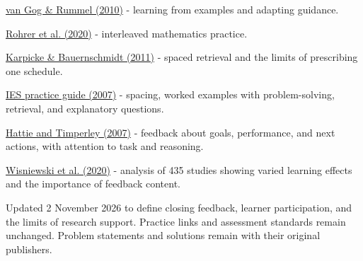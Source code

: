 \documentclass[11pt,letterpaper]{article}
\begin{document}
\href{https://link.springer.com/article/10.1007/s10648-010-9134-7}{van Gog \& Rummel (2010)} - learning from examples and adapting guidance.

\href{https://doi.org/10.1037/EDU0000367}{Rohrer et al. (2020)} - interleaved mathematics practice.

\href{https://pubmed.ncbi.nlm.nih.gov/21574747/}{Karpicke \& Bauernschmidt (2011)} - spaced retrieval and the limits of prescribing one schedule.

\href{https://ies.ed.gov/ncee/wwc/PracticeGuide/1}{IES practice guide (2007)} - spacing, worked examples with problem-solving, retrieval, and explanatory questions.

\href{https://assess.ucr.edu/sites/g/files/rcwecm2336/files/2019-02/hattietimperley_2007.pdf}{Hattie and Timperley (2007)} - feedback about goals, performance, and next actions, with attention to task and reasoning.

\href{https://www.frontiersin.org/journals/psychology/articles/10.3389/fpsyg.2019.03087/full}{Wisniewski et al. (2020)} - analysis of 435 studies showing varied learning effects and the importance of feedback content.

Updated 2 November 2026 to define closing feedback, learner participation, and the limits of research support. Practice links and assessment standards remain unchanged. Problem statements and solutions remain with their original publishers.
\end{document}
